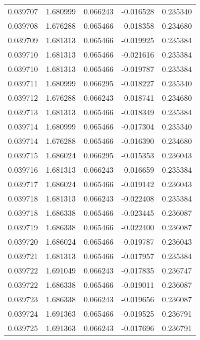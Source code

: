 \begin{tabular}{lrrrr}
0.039707    &  1.680999 &  0.066243 & -0.016528 &             0.235340 \\
0.039708    &  1.676288 &  0.065466 & -0.018358 &             0.234680 \\
0.039709    &  1.681313 &  0.065466 & -0.019925 &             0.235384 \\
0.039710    &  1.681313 &  0.065466 & -0.021616 &             0.235384 \\
0.039710    &  1.681313 &  0.065466 & -0.019787 &             0.235384 \\
0.039711    &  1.680999 &  0.066295 & -0.018227 &             0.235340 \\
0.039712    &  1.676288 &  0.066243 & -0.018741 &             0.234680 \\
0.039713    &  1.681313 &  0.065466 & -0.018349 &             0.235384 \\
0.039714    &  1.680999 &  0.065466 & -0.017304 &             0.235340 \\
0.039714    &  1.676288 &  0.065466 & -0.016390 &             0.234680 \\
0.039715    &  1.686024 &  0.066295 & -0.015353 &             0.236043 \\
0.039716    &  1.681313 &  0.066243 & -0.016659 &             0.235384 \\
0.039717    &  1.686024 &  0.065466 & -0.019142 &             0.236043 \\
0.039718    &  1.681313 &  0.066243 & -0.022408 &             0.235384 \\
0.039718    &  1.686338 &  0.065466 & -0.023445 &             0.236087 \\
0.039719    &  1.686338 &  0.065466 & -0.022400 &             0.236087 \\
0.039720    &  1.686024 &  0.065466 & -0.019787 &             0.236043 \\
0.039721    &  1.681313 &  0.065466 & -0.017957 &             0.235384 \\
0.039722    &  1.691049 &  0.066243 & -0.017835 &             0.236747 \\
0.039722    &  1.686338 &  0.065466 & -0.019011 &             0.236087 \\
0.039723    &  1.686338 &  0.066243 & -0.019656 &             0.236087 \\
0.039724    &  1.691363 &  0.065466 & -0.019525 &             0.236791 \\
0.039725    &  1.691363 &  0.066243 & -0.017696 &             0.236791 \\

\end{tabular}
